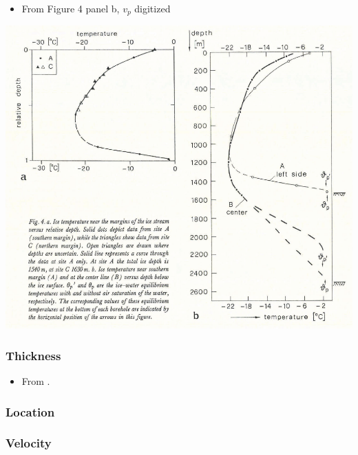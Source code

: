 \documentclass[article,a4paper,times,11pt,twoside]{article}
\begin{document}
\begin{itemize}
\item From \textcite{iken_1993} Figure 4 panel b, \(v_p\) digitized
\end{itemize}
\begin{center}
\includegraphics[width=.9\linewidth]{jakobshavn_left/iken_1993_fig4.png}
\end{center}

\subsubsection{Thickness}
\label{sec:org1eb2aed}

\begin{itemize}
\item From \textcite{iken_1993}.
\end{itemize}

\subsubsection{Location}
\label{sec:orgf907be9}

\subsubsection{Velocity}
\label{sec:org3a1fe63}
\clearpage
\end{document}
